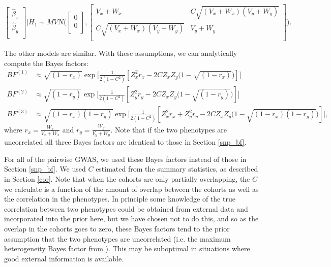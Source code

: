 \documentclass[11pt,titlepage]{article}
\begin{document}
\begin{equation}
    \begin{bmatrix}
    \hat \beta_x        \\[0.3em]
      \hat \beta_y     \\[0.3em]
     \end{bmatrix} | H_1
     \sim 
     MVN \bigg( 
          \begin{bmatrix}
     0       \\[0.3em]
     0     \\[0.3em]
     \end{bmatrix}
     , 
        \begin{bmatrix}
     V_x+W_x  & C\sqrt{ (V_x+W_x)(V_y+W_y)}  \\[0.3em]
       C\sqrt{ (V_x+W_x)(V_y+W_y)}  & V_y+W_y    \\[0.3em]
     \end{bmatrix}
 \bigg).
\end{equation}

The other models are similar. With these assumptions, we can analytically compute the Bayes factors:
\begin{align}
BF^{(1)} &\approx \sqrt{(1-r_x)} \exp \bigg[\frac{1}{2(1-C^2)} [ Z_x^2 r_x - 2C Z_x Z_y \big(1-\sqrt{ (1-r_x)} \big)] \bigg] \\
BF^{(2)} &\approx \sqrt{(1-r_y)} \exp \bigg[\frac{1}{2(1-C^2)} [ Z_y^2 r_y - 2C Z_x Z_y \big(1-\sqrt{ (1-r_y)} \big)] \bigg] \\
BF^{(3)} &\approx \sqrt{(1-r_x)(1-r_y)} \exp \bigg[\frac{1}{2(1-C^2)} [ Z_x^2 r_x +Z_y^2 r_y- 2C Z_x Z_y \big(1-\sqrt{ (1-r_x)(1-r_y)} \big)] \bigg],
\end{align}
\noindent where $r_x = \frac{W_x}{V_x+W_x}$ and $r_y = \frac{W_y}{V_y+W_y}$. Note that if the two phenotypes are uncorrelated all three Bayes factors are identical to those in Section \ref{snp_bf}. 

For all of the pairwise GWAS, we used these Bayes factors instead of those in Section \ref{snp_bf}. We used $C$ estimated from the summary statistics, as described in Section \ref{cor}. Note that when the cohorts are only partially overlapping, the $C$ we calculate is a function of the amount of overlap between the cohorts as well as the correlation in the phenotypes. In principle some knowledge of the true correlation between two phenotypes could be obtained from external data and incorporated into the prior here, but we have chosen not to do this, and so as the overlap in the cohorts goes to zero, these Bayes factors tend to the prior assumption that the two phenotypes are uncorrelated (i.e. the maximum heterogeneity Bayes factor from  \citet{wen2014bayesian}). This may be suboptimal in situations where good external information is available.
\end{document}
